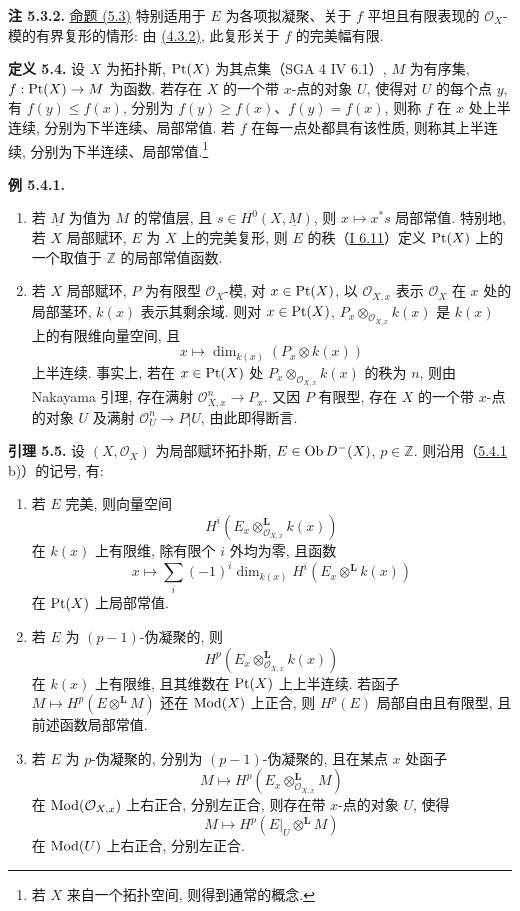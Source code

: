 \textbf{注 5.3.2.} \hyperlink{sga6.e03.prop.5-3}{命题 (5.3)} 特别适用于 \(E\) 为各项拟凝聚、关于 \(f\) 平坦且有限表现的 \(\mathcal O_X\)-模的有界复形的情形: 由 \hyperlink{sga6.e03.cor.4-3-2}{(4.3.2)}, 此复形关于 \(f\) 的完美幅有限.

\textbf{定义 5.4.} 设 \(X\) 为拓扑斯, \(\operatorname{Pt}(X)\) 为其点集（SGA 4 IV 6.1）, \(M\) 为有序集, \(f:\operatorname{Pt}(X)\to M\) 为函数. 若存在 \(X\) 的一个带 \(x\)-点的对象 \(U\), 使得对 \(U\) 的每个点 \(y\), 有 \(f(y)\leq f(x)\), 分别为 \(f(y)\geq f(x)\)、\(f(y)=f(x)\), 则称 \(f\) 在 \(x\) 处上半连续, 分别为下半连续、局部常值. 若 \(f\) 在每一点处都具有该性质, 则称其上半连续, 分别为下半连续、局部常值.\footnote{若 \(X\) 来自一个拓扑空间, 则得到通常的概念.}

\textbf{例 5.4.1.}
\begin{enumerate}[label=\alph*)]
\item 若 \(\underline M\) 为值为 \(M\) 的常值层, 且 \(s\in H^0(X,\underline M)\), 则 \(x\mapsto x^*s\) 局部常值. 特别地, 若 \(X\) 局部赋环, \(E\) 为 \(X\) 上的完美复形, 则 \(E\) 的秩（\hyperlink{sga6.e01.def.6-11}{I 6.11}）定义 \(\operatorname{Pt}(X)\) 上的一个取值于 \(\mathbb Z\) 的局部常值函数.
\item 若 \(X\) 局部赋环, \(P\) 为有限型 \(\mathcal O_X\)-模, 对 \(x\in\operatorname{Pt}(X)\), 以 \(\mathcal O_{X,x}\) 表示 \(\mathcal O_X\) 在 \(x\) 处的局部茎环, \(k(x)\) 表示其剩余域. 则对 \(x\in\operatorname{Pt}(X)\), \(P_x\otimes_{\mathcal O_{X,x}}k(x)\) 是 \(k(x)\) 上的有限维向量空间, 且
\[
 x\longmapsto \dim_{k(x)}(P_x\otimes k(x))
\]
上半连续. 事实上, 若在 \(x\in\operatorname{Pt}(X)\) 处 \(P_x\otimes_{\mathcal O_{X,x}}k(x)\) 的秩为 \(n\), 则由 Nakayama 引理, 存在满射 \(\mathcal O_{X,x}^{n}\to P_x\). 又因 \(P\) 有限型, 存在 \(X\) 的一个带 \(x\)-点的对象 \(U\) 及满射 \(\mathcal O_U^n\to P|U\), 由此即得断言.
\end{enumerate}

\textbf{引理 5.5.} 设 \((X,\mathcal O_X)\) 为局部赋环拓扑斯, \(E\in\operatorname{Ob} D^{-}(X)\), \(p\in\mathbb Z\). 则沿用（\hyperlink{sga6.e03.ex.5-4-1}{5.4.1} b)）的记号, 有:
\begin{enumerate}[label=\roman*)]
\item 若 \(E\) 完美, 则向量空间
\[
 H^i(E_x\otimes_{\mathcal O_{X,x}}^{\mathbf L}k(x))
\]
在 \(k(x)\) 上有限维, 除有限个 \(i\) 外均为零, 且函数
\[
 x\longmapsto
 \sum_i(-1)^i\dim_{k(x)}H^i(E_x\otimes^{\mathbf L}k(x))
\]
在 \(\operatorname{Pt}(X)\) 上局部常值.
\item 若 \(E\) 为 \((p-1)\)-伪凝聚的, 则
\[
 H^p(E_x\otimes_{\mathcal O_{X,x}}^{\mathbf L}k(x))
\]
在 \(k(x)\) 上有限维, 且其维数在 \(\operatorname{Pt}(X)\) 上上半连续. 若函子 \(M\mapsto H^p(E\otimes^{\mathbf L}M)\) 还在 \(\operatorname{Mod}(X)\) 上正合, 则 \(H^p(E)\) 局部自由且有限型, 且前述函数局部常值.
\item 若 \(E\) 为 \(p\)-伪凝聚的, 分别为 \((p-1)\)-伪凝聚的, 且在某点 \(x\) 处函子
\[
 M\longmapsto H^p(E_x\otimes_{\mathcal O_{X,x}}^{\mathbf L}M)
\]
在 \(\operatorname{Mod}(\mathcal O_{X,x})\) 上右正合, 分别左正合, 则存在带 \(x\)-点的对象 \(U\), 使得
\[
 M\longmapsto H^p(E|_U\otimes^{\mathbf L}M)
\]
在 \(\operatorname{Mod}(U)\) 上右正合, 分别左正合.
\end{enumerate}

